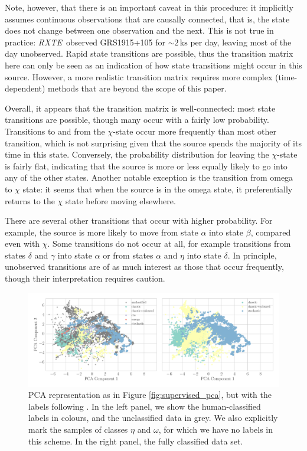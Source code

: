 \documentclass[fleqn,usenatbib]{mnras}
\newcommand{\project}[1]{\textsl{#1}}
\newcommand{\rxte}{\project{RXTE}}
\begin{document}
Note, however, that there is an important caveat in this procedure: it implicitly assumes continuous observations that are causally connected, that is, the state 
does not change between one observation and the next. This is not true in practice: \rxte\ observed GRS1915+105 for $\sim 2\,\mathrm{ks}$ per day, leaving most 
of the day unobserved. Rapid state transitions are possible, thus the transition matrix here can only be seen as an indication of how state transitions might occur 
in this source. However, a more realistic transition matrix requires more complex (time-dependent) methods that are beyond the scope of this paper.

Overall, it appears that the transition matrix is well-connected: most state transitions are possible, though many occur with a fairly low probability.
Transitions to and from the $\chi$-state occur more frequently than most other transition, which is not surprising given that the source spends the majority of its time 
in this state. Conversely, the probability distribution for leaving the $\chi$-state is fairly flat, indicating that the source is more or less equally likely to go into any 
of the other states. Another notable exception is the transition from omega to $\chi$ state: it seems that when the source is in the omega state, it preferentially 
returns to the $\chi$ state before moving elsewhere. 

There are several other transitions that occur with higher probability. For example, the source is more likely to move from state $\alpha$ into state $\beta$, compared even with $\chi$. 
Some transitions do not occur at all, for example transitions from states $\delta$ and $\gamma$ into state $\alpha$ or from states $\alpha$ and $\eta$ into state $\delta$. In principle, unobserved transitions are of as much interest as those that occur frequently, though their interpretation requires caution. 

\begin{figure}
\begin{center}
\includegraphics[width=\textwidth]{grs1915_supervised_phys_features_pca.pdf}
\caption{PCA representation as in Figure \ref{fig:supervised_pca}, but with the labels following \citet{harikrishnan2011}. In the left panel, we show the human-classified labels in colours, and the unclassified data in grey. We also explicitly mark the samples of classes $\eta$ and $\omega$, for which we have no labels in this scheme. In the right panel, the fully classified data set.} 
\label{fig:pca_physical}
\end{center}
\end{figure}
\end{document}
